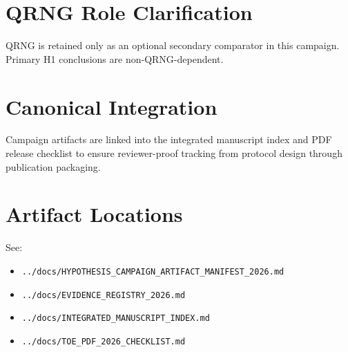 \documentclass[11pt]{article}
\begin{document}
\section{QRNG Role Clarification}
QRNG is retained only as an optional secondary comparator in this campaign. Primary H1 conclusions are non-QRNG-dependent.

\section{Canonical Integration}
Campaign artifacts are linked into the integrated manuscript index and PDF release checklist to ensure reviewer-proof tracking from protocol design through publication packaging.

\section*{Artifact Locations}
See:
\begin{itemize}
    \item \texttt{../docs/HYPOTHESIS\_CAMPAIGN\_ARTIFACT\_MANIFEST\_2026.md}
    \item \texttt{../docs/EVIDENCE\_REGISTRY\_2026.md}
    \item \texttt{../docs/INTEGRATED\_MANUSCRIPT\_INDEX.md}
    \item \texttt{../docs/TOE\_PDF\_2026\_CHECKLIST.md}
\end{itemize}
\end{document}
